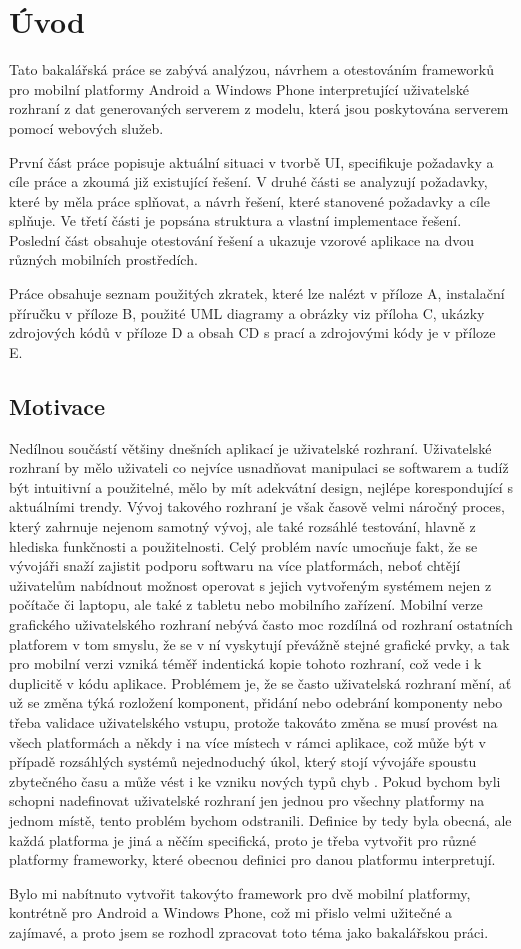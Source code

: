 \chapter{Úvod}
Tato bakalářská práce se zabývá analýzou, návrhem a otestováním frameworků pro mobilní platformy Android a Windows Phone interpretující uživatelské rozhraní z dat generovaných serverem z modelu, která jsou poskytována serverem pomocí webových služeb.

První část práce popisuje aktuální situaci v tvorbě UI, specifikuje požadavky a cíle práce a zkoumá již existující řešení. V druhé části se analyzují požadavky, které by měla práce splňovat, a návrh řešení, které stanovené požadavky a cíle splňuje. Ve třetí části je popsána struktura a vlastní implementace řešení. Poslední část obsahuje otestování řešení a ukazuje vzorové aplikace na dvou různých mobilních prostředích.

Práce obsahuje seznam použitých zkratek, které lze nalézt v příloze A, instalační příručku v příloze B, použité UML diagramy a obrázky viz příloha C, ukázky zdrojových kódů v příloze D a obsah CD s prací a zdrojovými kódy je v příloze E.
 
\section{Motivace}
Nedílnou součástí většiny dnešních aplikací je uživatelské rozhraní. Uživatelské rozhraní by mělo uživateli co nejvíce usnadňovat manipulaci se softwarem a tudíž být intuitivní a použitelné, mělo by mít adekvátní design, nejlépe korespondující s aktuálními trendy. Vývoj takového rozhraní je však časově velmi náročný proces, který zahrnuje nejenom samotný vývoj, ale také rozsáhlé testování, hlavně z hlediska funkčnosti a použitelnosti. Celý problém navíc umocňuje fakt, že se vývojáři snaží zajistit podporu softwaru na více platformách, neboť chtějí uživatelům nabídnout možnost operovat s jejich vytvořeným systémem nejen z počítače či laptopu, ale také z tabletu nebo mobilního zařízení. Mobilní verze grafického uživatelského rozhraní nebývá často moc rozdílná od rozhraní ostatních platforem v tom smyslu, že se v ní vyskytují převážně stejné grafické prvky, a tak pro mobilní verzi vzniká téměř indentická kopie tohoto rozhraní, což vede i k duplicitě v kódu aplikace. Problémem je, že se často uživatelská rozhraní mění, ať už se změna týká rozložení komponent, přidání nebo odebrání komponenty nebo třeba validace uživatelského vstupu, protože takováto změna se musí provést na všech platformách a někdy i na více místech v rámci aplikace, což může být v případě rozsáhlých systémů nejednoduchý úkol, který stojí vývojáře spoustu zbytečného času a může vést i ke vzniku nových typů chyb \cite{towards-smart-design}. Pokud bychom byli schopni nadefinovat uživatelské rozhraní jen jednou pro všechny platformy na jednom místě, tento problém bychom odstranili. Definice by tedy byla obecná, ale každá platforma je jiná a něčím specifická, proto je třeba vytvořit pro různé platformy frameworky, které obecnou definici pro danou platformu interpretují. 

Bylo mi nabítnuto vytvořit takovýto framework pro dvě mobilní platformy, kontrétně pro Android a Windows Phone, což mi přislo velmi užitečné a zajímavé, a proto jsem se rozhodl zpracovat toto téma jako bakalářskou práci.
